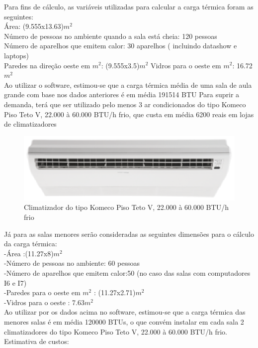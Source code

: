 Para fins de cálculo, as variáveis utilizadas para calcular a carga térmica foram as seguintes:
\\
Área: (9.555x13.63)$m^2$
\\
Número de pessoas no ambiente quando a sala está cheia: 120 pessoas
\\
Número de aparelhos que emitem calor: 30 aparelhos ( incluindo datashow e laptops)
\\
Paredes na direção oeste em $m^2$: (9.555x3.5)$m^2$
Vidros para o oeste em $m^2$: 16.72$m^2$
\\
Ao utilizar o software, estimou-se que a carga térmica média de uma sala de aula grande com base nos dados anteriores é em média 191514 BTU
Para suprir a demanda, terá que ser utilizado pelo menos 3 ar condicionados do tipo
Komeco Piso Teto V, 22.000 à 60.000 BTU/h frio, que custa em média 6200 reais em lojas de climatizadores

\begin{figure}[!h]
  \centering
  \includegraphics[keepaspectratio=true,scale=1]{figuras/arcondicionado.eps}
  \caption{Climatizador do tipo Komeco Piso Teto V, 22.000 à 60.000 BTU/h frio}
  \label{fig:climatizador}
\end{figure}

Já para as salas menores serão consideradas as seguintes dimensões para o cálculo da carga térmica:
\\
-Área :(11.27x8)$m^2$
\\
-Número de pessoas no ambiente: 60 pessoas
\\
-Número de aparelhos que emitem calor:50 (no caso das salas com computadores I6 e I7)
\\
-Paredes para o oeste em $m^2$ : (11.27x2.71)$m^2$
\\
-Vidros para o oeste : 7.63$m^2$
\\
Ao utilizar por os dados acima no software, estimou-se que a carga térmica das menores salas é em média 120000 BTUs, o que convém instalar em cada sala 2 climatizadores do tipo Komeco Piso Teto V, 22.000 à 60.000 BTU/h frio. Estimativa de custos:

